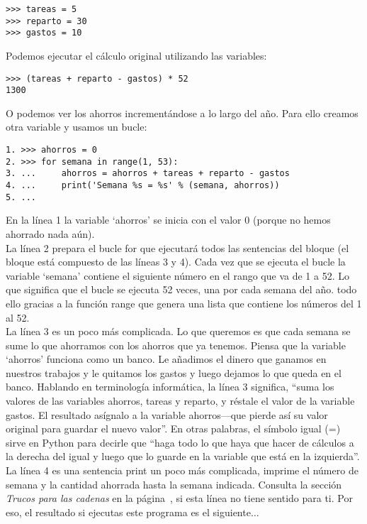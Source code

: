 \begin{listing}
\begin{verbatim}
>>> tareas = 5
>>> reparto = 30
>>> gastos = 10
\end{verbatim}
\end{listing}

Podemos ejecutar el cálculo original utilizando las variables:

\begin{listing}
\begin{verbatim}
>>> (tareas + reparto - gastos) * 52
1300
\end{verbatim}
\end{listing}

O podemos ver los ahorros incrementándose a lo largo del año. Para ello creamos otra variable y usamos un bucle:

\begin{listing}
\begin{verbatim}
1. >>> ahorros = 0
2. >>> for semana in range(1, 53):
3. ...     ahorros = ahorros + tareas + reparto - gastos
4. ...     print('Semana %s = %s' % (semana, ahorros))
5. ...
\end{verbatim}
\end{listing}

En la línea 1 la variable `ahorros' se inicia con el valor 0 (porque no hemos ahorrado nada aún).\\
La línea 2 prepara el bucle for que ejecutará todos las sentencias del bloque (el bloque está compuesto de las líneas 3 y 4).  Cada vez que se ejecuta el bucle la variable `semana' contiene el siguiente número en el rango que va de 1 a 52. Lo que significa que el bucle se ejecuta 52 veces, una por cada semana del año. todo ello gracias a la función range que genera una lista que contiene los números del 1 al 52.\\
La línea 3 es un poco más complicada.  Lo que queremos es que cada semana se sume lo que ahorramos con los ahorros que ya tenemos.   Piensa que la variable `ahorros' funciona como un banco.  Le añadimos el dinero que ganamos en nuestros trabajos y le quitamos los gastos y luego dejamos lo que queda en el banco.  Hablando en terminología informática, la línea 3 significa, ``suma los valores de las variables ahorros, tareas y  reparto, y réstale el valor de la variable gastos. El resultado asígnalo a la variable ahorros---que pierde así su valor original para guardar el nuevo valor''. En otras palabras, el símbolo igual (=) sirve en Python para decirle que ``haga todo lo que haya que hacer de cálculos a la derecha del igual y luego que lo guarde en la variable que está en la izquierda''.\\ 
La línea 4 es una sentencia print un poco más complicada, imprime el número de semana y la cantidad ahorrada hasta la semana indicada.  Consulta la sección \emph{Trucos para las cadenas} en la página~\pageref{trickswithstrings}, si esta línea no tiene sentido para ti.  Por eso, el resultado si ejecutas este programa es el siguiente$\ldots$


